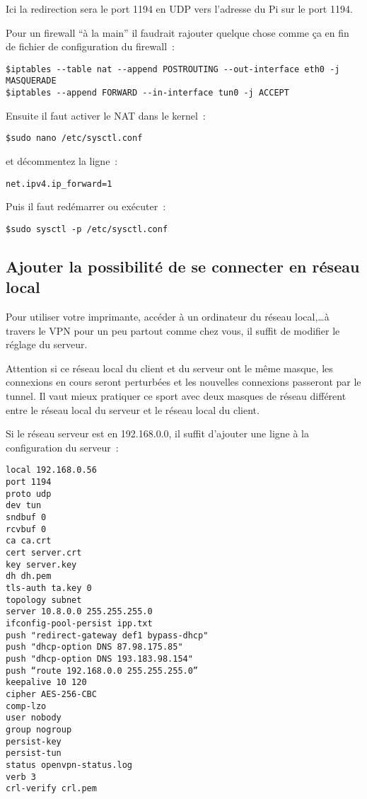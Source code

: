 Ici la redirection sera le port 1194 en UDP vers l'adresse du Pi sur le port 1194.

Pour un firewall ``à la main'' il faudrait rajouter quelque chose comme ça en fin de fichier de configuration du firewall~:
\begin{verbatim}
$iptables --table nat --append POSTROUTING --out-interface eth0 -j MASQUERADE
$iptables --append FORWARD --in-interface tun0 -j ACCEPT
\end{verbatim}

Ensuite il faut activer le NAT dans le kernel~:
\begin{verbatim}
$sudo nano /etc/sysctl.conf
\end{verbatim}

et décommentez la ligne~:

\begin{verbatim}
net.ipv4.ip_forward=1
\end{verbatim}

Puis il faut redémarrer ou exécuter~:

\begin{verbatim}
$sudo sysctl -p /etc/sysctl.conf
\end{verbatim}

\subsection{Ajouter la possibilité de se connecter en réseau local}

Pour utiliser votre imprimante, accéder à un ordinateur du réseau local,\dots à travers le VPN pour un peu partout comme chez vous, il suffit de modifier le réglage du serveur.

Attention si ce réseau local du client et du serveur ont le même masque, les connexions en cours seront perturbées et les nouvelles connexions passeront par le tunnel. Il vaut mieux pratiquer ce sport avec deux masques de réseau différent entre le réseau local du serveur  et le réseau local du client.

Si le réseau serveur est en 192.168.0.0, il suffit d'ajouter une ligne à la configuration du serveur~:
\begin{verbatim}
local 192.168.0.56
port 1194
proto udp
dev tun
sndbuf 0
rcvbuf 0
ca ca.crt
cert server.crt
key server.key
dh dh.pem
tls-auth ta.key 0
topology subnet
server 10.8.0.0 255.255.255.0
ifconfig-pool-persist ipp.txt
push "redirect-gateway def1 bypass-dhcp"
push "dhcp-option DNS 87.98.175.85"
push "dhcp-option DNS 193.183.98.154"
push “route 192.168.0.0 255.255.255.0”
keepalive 10 120
cipher AES-256-CBC
comp-lzo
user nobody
group nogroup
persist-key
persist-tun
status openvpn-status.log
verb 3
crl-verify crl.pem
\end{verbatim}

